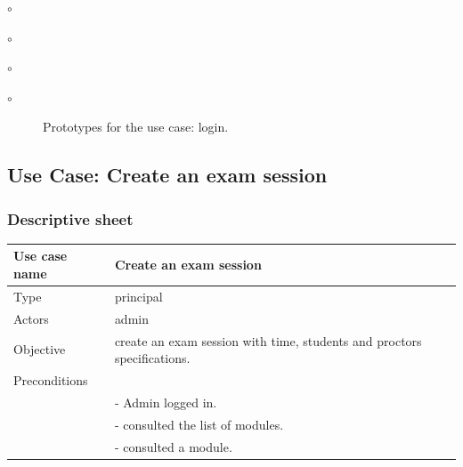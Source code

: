 \documentclass[]{uc2pfecaneva}
\begin{document}
\begin{list}{$\circ$}{}
\begin{list}{$\circ$}{}
\begin{list}{$\circ$}{}
\begin{list}{$\circ$}{}
\begin{figure}[h]
        \caption{Prototypes for the use case: login.}
    \end{figure}
    \clearpage


    \begin{table}[t]
        \raggedright\subsection{Use Case: Create an exam session}
        \subsubsection{Descriptive sheet}
        \centering
        \begin{tabularx}{\textwidth}{|l|X|}
            \hline
            Use case name         & Create an exam session                                                                                                                                            \\ \hline
            Type                  & principal                                                                                                                                                         \\ \hline
            Actors                & admin                                                                                                                                                             \\ \hline
            Objective             & create an exam session with time, students and proctors specifications.                                                                                           \\ \hline
            Preconditions         &                                                                                                                                                                   \\
            & - Admin logged in.                                                                                                                                                \\
            & - consulted the list of modules.                                                                                                                                  \\
            & - consulted a module.                                                                                                                                             \\ \hline

\end{tabularx}
\end{table}
\end{list}
\end{list}
\end{list}
\end{list}
\end{document}
